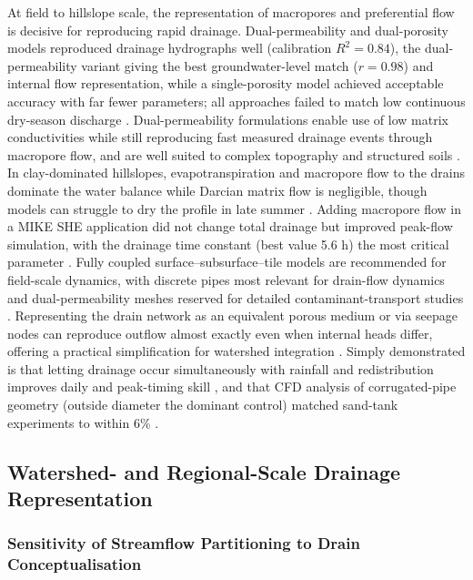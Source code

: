 \documentclass[11pt]{article}
\begin{document}
At field to hillslope scale, the representation of macropores and preferential flow is decisive for reproducing rapid drainage. Dual-permeability and dual-porosity models reproduced drainage hydrographs well (calibration $R^2=0.84$), the dual-permeability variant giving the best groundwater-level match ($r=0.98$) and internal flow representation, while a single-porosity model achieved acceptable accuracy with far fewer parameters; all approaches failed to match low continuous dry-season discharge \parencite{Varvaris2018}. Dual-permeability formulations enable use of low matrix conductivities while still reproducing fast measured drainage events through macropore flow, and are well suited to complex topography and structured soils \parencite{Warsta2014,Salo2017}. In clay-dominated hillslopes, evapotranspiration and macropore flow to the drains dominate the water balance while Darcian matrix flow is negligible, though models can struggle to dry the profile in late summer \parencite{Koivusalo1999}. Adding macropore flow in a MIKE SHE application did not change total drainage but improved peak-flow simulation, with the drainage time constant (best value 5.6 h) the most critical parameter \parencite{Zhou2013}. Fully coupled surface--subsurface--tile models are recommended for field-scale dynamics, with discrete pipes most relevant for drain-flow dynamics and dual-permeability meshes reserved for detailed contaminant-transport studies \parencite{DeSchepper2015}. Representing the drain network as an equivalent porous medium or via seepage nodes can reproduce outflow almost exactly even when internal heads differ, offering a practical simplification for watershed integration \parencite{DeSchepper2015,Carlier2007,Boico2022}. Simply demonstrated is that letting drainage occur simultaneously with rainfall and redistribution improves daily and peak-timing skill \parencite{Xian2017}, and that CFD analysis of corrugated-pipe geometry (outside diameter the dominant control) matched sand-tank experiments to within 6\% \parencite{Wu2022}.

\subsection{Watershed- and Regional-Scale Drainage Representation}

\subsubsection{Sensitivity of Streamflow Partitioning to Drain Conceptualisation}
\end{document}
